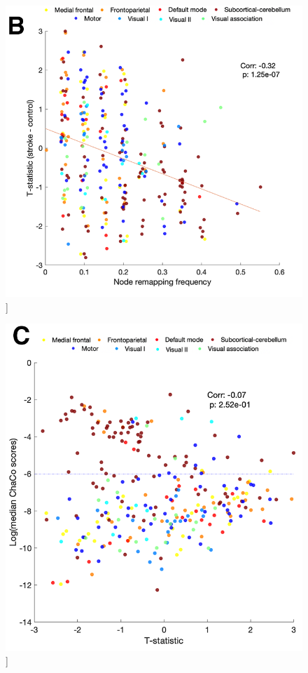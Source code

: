 \documentclass[phd,tocprelim]{cornell}
\renewcommand{\caption}[1]{\singlespacing\hangcaption{#1}\normalspacing}
\begin{document}
\begin{figure}[h!]
		\ContinuedFloat
		\captionsetup{labelformat=adja-page}
    \centering
    \includegraphics[width=\textwidth]{chapter1/SupplementaryFigure12B.png}
    \caption[]{}
\end{figure}
\null
\vfill
\clearpage
\null
\vfill
\begin{figure}[h!]
		\ContinuedFloat
		\captionsetup{labelformat=adja-page}
    \centering
    \includegraphics[width=\textwidth]{chapter1/SupplementaryFigure12C.png}
    \caption[]{}
\end{figure}
\end{document}
